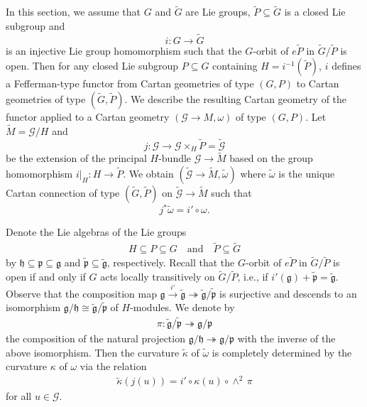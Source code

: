 \documentclass[11pt]{amsart}
\begin{document}
In this section, we assume that $G$ and $\tilde G$ are Lie groups, $\tilde P\subseteq\tilde G$ is a closed Lie subgroup and \[i:G\to\tilde G\] is an injective Lie group homomorphism such that the $G$-orbit of $e\tilde P$ in $\tilde G/\tilde P$ is open. Then for any closed Lie subgroup $P\subseteq G$ containing $H=i^{-1}(\tilde P)$, $i$ defines a Fefferman-type functor from Cartan geometries of type $(G,P)$ to Cartan geometries of type $(\tilde G,\tilde P)$. We describe the resulting Cartan geometry of the functor applied to a Cartan geometry $(\mathcal G\to M,\omega)$ of type $(G,P)$. Let $\tilde M=\mathcal G/H$ and
\[j:\mathcal G\to\mathcal G\times_H\tilde P=\tilde{\mathcal G}\]
be the extension of the principal $H$-bundle $\mathcal G\to\tilde M$ based on the group homomorphism $i|_H:H\to\tilde P$. We obtain $(\tilde{\mathcal G}\to\tilde M,\tilde\omega)$ where $\tilde\omega$ is the unique Cartan connection of type $(\tilde G,\tilde P)$ on $\tilde{\mathcal G}\to\tilde M$ such that \[j^*\tilde\omega=i'\circ\omega.\]

Denote the Lie algebras of the Lie groups 
\begin{align*}
H\subseteq P\subseteq G\quad\text{and}\quad\tilde P\subseteq\tilde G    
\end{align*} by $\mathfrak h\subseteq\mathfrak p\subseteq\mathfrak g$ and $\tilde{\mathfrak p}\subseteq\tilde{\mathfrak g}$, respectively. Recall that the $G$-orbit of $e\tilde P$ in $\tilde G/\tilde P$ is open if and only if $G$ acts locally transitively on $\tilde G/\tilde P$, i.e., if $i'(\mathfrak g)+\tilde{\mathfrak p}=\tilde{\mathfrak g}$. Observe that the composition map $\mathfrak g\xrightarrow{i'} \tilde{\mathfrak g}\twoheadrightarrow\tilde{\mathfrak g}/\tilde{\mathfrak p}$ is surjective and descends to an isomorphism $\mathfrak g/\mathfrak h\cong\tilde{\mathfrak g}/\tilde{\mathfrak p}$ of $H$-modules. We denote by
\begin{align*}
 \pi:\tilde{\mathfrak g}/\tilde{\mathfrak p}\twoheadrightarrow\mathfrak g/\mathfrak p   
\end{align*}
the composition of the natural projection $\mathfrak g/\mathfrak h\twoheadrightarrow\mathfrak g/\mathfrak p$ with the inverse of the above isomorphism. Then the curvature $\tilde\kappa$ of $\tilde\omega$ is completely determined by the curvature $\kappa$ of $\omega$ via the relation
\begin{align}\label{tilde kappa}
    \tilde\kappa(j(u))=i'\circ\kappa(u)\circ\wedge^2\, \pi
\end{align}
for all $u\in\mathcal G$.
\end{document}
